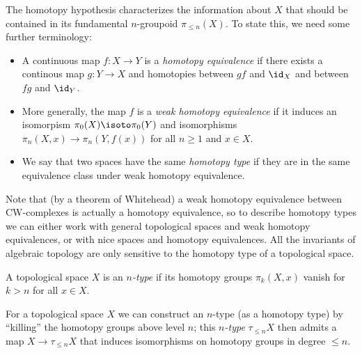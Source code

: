 \documentclass[a4paper,12pt]{article}
\begin{document}
The homotopy hypothesis characterizes the information about $X$ that
should be contained in its fundamental $n$-groupoid $\pi_{\leq
  n}(X)$. To state this, we need some further terminology:
\begin{itemize}
\item A continuous map $f \colon X \to Y$ is a \emph{homotopy
    equivalence} if there exists a continous map $g \colon Y \to X$
  and homotopies between $gf$ and $\id_{X}$ and between $fg$ and
  $\id_{Y}$.
\item More generally, the map $f$ is a \emph{weak
  homotopy equivalence} if it induces an isomorpism
$\pi_{0}(X) \isoto \pi_{0}(Y)$ and isomorphisms
$\pi_{n}(X,x) \to \pi_{n}(Y,f(x))$ for all $n \geq 1$ and $x \in
X$.
\item We say that two spaces have the same \emph{homotopy type} if
  they are in the same equivalence class under weak homotopy
  equivalence.
\end{itemize}
Note that (by a theorem of Whitehead) a weak homotopy equivalence
between CW-complexes is actually a homotopy equivalence, so to
describe homotopy types we can either work with general topological
spaces and weak homotopy equivalences, or with nice spaces and
homotopy equivalences. All the invariants of algebraic topology are
only sensitive to the homotopy type of a topological space.

\begin{defn}
  A topological space $X$ is an \emph{$n$-type} if its homotopy groups
  $\pi_{k}(X,x)$ vanish for $k > n$ for all $x \in X$.
\end{defn}

For a topological space $X$ we can construct an $n$-type (as a
homotopy type) by ``killing'' the homotopy groups above level $n$;
this \emph{$n$-type} $\tau_{\leq n}X$ then admits a map
$X \to \tau_{\leq n}X$ that induces isomorphisms on homotopy groups in
degree $\leq n$.
\end{document}
